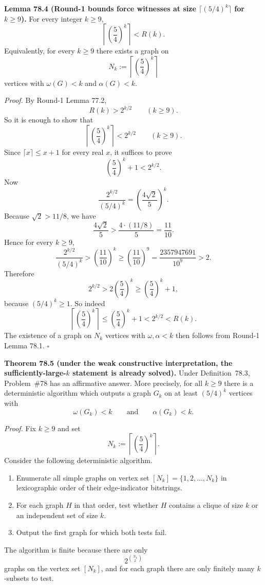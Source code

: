 \medskip
\noindent\textbf{Lemma 78.4 (Round-1 bounds force witnesses at size $\lceil(5/4)^k\rceil$ for $k\ge 9$).}
For every integer $k\ge 9$,
\[
\left\lceil\left(\frac54\right)^k\right\rceil < R(k).
\]
Equivalently, for every $k\ge 9$ there exists a graph on
\[
N_k:=\left\lceil\left(\frac54\right)^k\right\rceil
\]
vertices with $\omega(G)<k$ and $\alpha(G)<k$.

\emph{Proof.}
By Round-1 Lemma 77.2,
\[
R(k)>2^{k/2}\qquad (k\ge 9).
\]
So it is enough to show that
\[
\left\lceil\left(\frac54\right)^k\right\rceil < 2^{k/2}
\qquad (k\ge 9).
\]
Since $\lceil x\rceil\le x+1$ for every real $x$, it suffices to prove
\[
\left(\frac54\right)^k+1<2^{k/2}.
\]
Now
\[
\frac{2^{k/2}}{(5/4)^k}=\left(\frac{4\sqrt2}{5}\right)^k.
\]
Because $\sqrt2>11/8$, we have
\[
\frac{4\sqrt2}{5}>\frac{4\cdot(11/8)}{5}=\frac{11}{10}.
\]
Hence for every $k\ge 9$,
\[
\frac{2^{k/2}}{(5/4)^k}>\left(\frac{11}{10}\right)^k\ge \left(\frac{11}{10}\right)^9
=\frac{2357947691}{10^9}>2.
\]
Therefore
\[
2^{k/2}>2\left(\frac54\right)^k\ge \left(\frac54\right)^k+1,
\]
because $(5/4)^k\ge 1$.
So indeed
\[
\left\lceil\left(\frac54\right)^k\right\rceil \le \left(\frac54\right)^k+1 < 2^{k/2} < R(k).
\]
The existence of a graph on $N_k$ vertices with $\omega,\alpha<k$ then follows from Round-1 Lemma 78.1. \hfill$\square$

\medskip
\noindent\textbf{Theorem 78.5 (under the weak constructive interpretation, the sufficiently-large-$k$ statement is already solved).}
Under Definition~78.3, Problem~\#78 has an affirmative answer.
More precisely, for all $k\ge 9$ there is a deterministic algorithm which outputs a graph $G_k$ on at least $(5/4)^k$ vertices with
\[
\omega(G_k)<k\qquad\text{and}\qquad \alpha(G_k)<k.
\]

\emph{Proof.}
Fix $k\ge 9$ and set
\[
N_k:=\left\lceil\left(\frac54\right)^k\right\rceil.
\]
Consider the following deterministic algorithm.
\begin{enumerate}
\item Enumerate all simple graphs on vertex set $[N_k]=\{1,2,\dots,N_k\}$ in lexicographic order of their edge-indicator bitstrings.
\item For each graph $H$ in that order, test whether $H$ contains a clique of size $k$ or an independent set of size $k$.
\item Output the first graph for which both tests fail.
\end{enumerate}
The algorithm is finite because there are only
\[
2^{\binom{N_k}{2}}
\]
graphs on the vertex set $[N_k]$, and for each graph there are only finitely many $k$-subsets to test.

